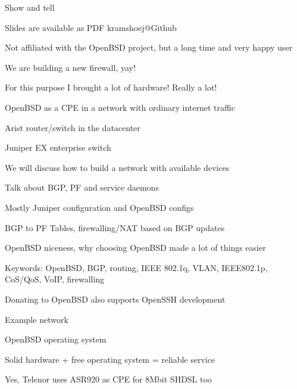 \documentclass[Screen16to9,17pt]{foils}
\begin{document}
{Show and tell}

\vskip 1cm
\centerline{\footnotesize Slides are available as PDF kramshoej@Github}



\centerline{\footnotesize Not affiliated with the OpenBSD project, but a long time and very happy user}


We are building a new firewall, yay!

For this purpose I brought a lot of hardware! Really a lot!
\begin{list2}
\item OpenBSD as a CPE in a network with ordinary internet traffic
\item Arist router/switch in the datacenter
\item Juniper EX enterprise switch
\item We will discuss how to build a network with available devices
\item Talk about BGP, PF and service daemons
\item Mostly Juniper configuration and OpenBSD configs
\item BGP to PF Tables, firewalling/NAT based on BGP updates
\item OpenBSD niceness, why choosing OpenBSD made a lot of things easier
\item Keywords:
OpenBSD, BGP, routing, IEEE 802.1q, VLAN, IEEE802.1p, CoS/QoS, VoIP, firewalling
\end{list2}



\centerline{Donating to OpenBSD also supports OpenSSH development}





Example network

\begin{list2}
\item OpenBSD operating system
\item Solid hardware + free operating system = reliable service
\item Yes, Telenor uses ASR920 as CPE for 8Mbit SHDSL too\smiley
\end{list2}
\end{document}
